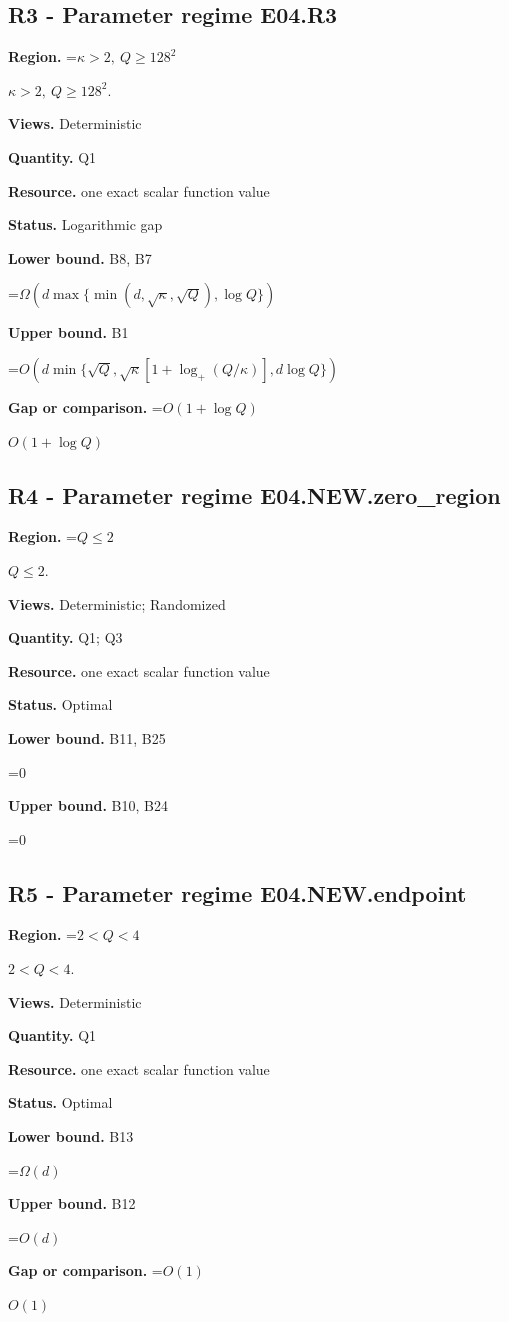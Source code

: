 \documentclass[10pt,a4paper]{article}
\newcommand{\AtlasMath}[1]{\par\begingroup\centering\setbox0=\hbox{$\displaystyle #1$}\ifdim\wd0>1.4\linewidth\typeout{ATLAS WIDE FORMULA: \the\wd0}\fi\ifdim\wd0>\linewidth\resizebox{\linewidth}{!}{\box0}\else\box0\fi\par\endgroup}
\newcommand{\AtlasInlineMath}[1]{\begingroup\setbox0=\hbox{$#1$}\ifdim\wd0>.4\linewidth\endgroup\AtlasMath{#1}\else\endgroup$#1$\fi}
\begin{document}
\subsection{R3 - Parameter regime E04.R3}
\textbf{Region.} \AtlasInlineMath{\kappa>2,\ Q\ge128^2}.

\textbf{Views.} Deterministic

\textbf{Quantity.} Q1

\textbf{Resource.} one exact scalar function value

\textbf{Status.} Logarithmic gap

\textbf{Lower bound.} B8, B7

\AtlasMath{\Omega\!\left(d\max\{\min(d,\sqrt\kappa,\sqrt Q),\log Q\}\right)}
\textbf{Upper bound.} B1

\AtlasMath{O(d\min\{\sqrt Q,\sqrt\kappa[1+\log_+(Q/\kappa)],d\log Q\})}
\textbf{Gap or comparison.} \AtlasInlineMath{O(1+\log Q)}

\subsection{R4 - Parameter regime E04.NEW.zero\_region}
\textbf{Region.} \AtlasInlineMath{Q\le2}.

\textbf{Views.} Deterministic; Randomized

\textbf{Quantity.} Q1; Q3

\textbf{Resource.} one exact scalar function value

\textbf{Status.} Optimal

\textbf{Lower bound.} B11, B25

\AtlasMath{0}
\textbf{Upper bound.} B10, B24

\AtlasMath{0}
\subsection{R5 - Parameter regime E04.NEW.endpoint}
\textbf{Region.} \AtlasInlineMath{2<Q<4}.

\textbf{Views.} Deterministic

\textbf{Quantity.} Q1

\textbf{Resource.} one exact scalar function value

\textbf{Status.} Optimal

\textbf{Lower bound.} B13

\AtlasMath{\Omega(d)}
\textbf{Upper bound.} B12

\AtlasMath{O(d)}
\textbf{Gap or comparison.} \AtlasInlineMath{O(1)}
\end{document}
